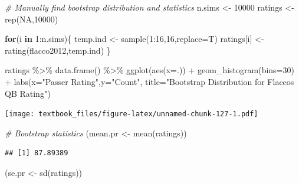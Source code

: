 \documentclass[
  11pt,
]{book}
\newenvironment{Shaded}{\begin{snugshade}}{\end{snugshade}}
\newcommand{\AttributeTok}[1]{\textcolor[rgb]{0.77,0.63,0.00}{#1}}
\newcommand{\CommentTok}[1]{\textcolor[rgb]{0.56,0.35,0.01}{\textit{#1}}}
\newcommand{\ConstantTok}[1]{\textcolor[rgb]{0.00,0.00,0.00}{#1}}
\newcommand{\ControlFlowTok}[1]{\textcolor[rgb]{0.13,0.29,0.53}{\textbf{#1}}}
\newcommand{\DecValTok}[1]{\textcolor[rgb]{0.00,0.00,0.81}{#1}}
\newcommand{\FunctionTok}[1]{\textcolor[rgb]{0.00,0.00,0.00}{#1}}
\newcommand{\NormalTok}[1]{#1}
\newcommand{\OtherTok}[1]{\textcolor[rgb]{0.56,0.35,0.01}{#1}}
\newcommand{\SpecialCharTok}[1]{\textcolor[rgb]{0.00,0.00,0.00}{#1}}
\newcommand{\StringTok}[1]{\textcolor[rgb]{0.31,0.60,0.02}{#1}}
\theoremstyle{definition}
\theoremstyle{definition}
\theoremstyle{definition}
\theoremstyle{definition}
\theoremstyle{remark}
\begin{document}
\newpage

\begin{Shaded}
\begin{Highlighting}[]
\CommentTok{\# Manually find bootstrap distribution and statistics}
\NormalTok{n.sims }\OtherTok{\textless{}{-}} \DecValTok{10000}
\NormalTok{ratings }\OtherTok{\textless{}{-}} \FunctionTok{rep}\NormalTok{(}\ConstantTok{NA}\NormalTok{,}\DecValTok{10000}\NormalTok{)}

\ControlFlowTok{for}\NormalTok{(i }\ControlFlowTok{in} \DecValTok{1}\SpecialCharTok{:}\NormalTok{n.sims)\{}
\NormalTok{  temp.ind }\OtherTok{\textless{}{-}} \FunctionTok{sample}\NormalTok{(}\DecValTok{1}\SpecialCharTok{:}\DecValTok{16}\NormalTok{,}\DecValTok{16}\NormalTok{,}\AttributeTok{replace=}\NormalTok{T)}
\NormalTok{  ratings[i] }\OtherTok{\textless{}{-}} \FunctionTok{rating}\NormalTok{(flacco2012,temp.ind)}
\NormalTok{\}}

\NormalTok{ratings }\SpecialCharTok{\%\textgreater{}\%} \FunctionTok{data.frame}\NormalTok{() }\SpecialCharTok{\%\textgreater{}\%} 
  \FunctionTok{ggplot}\NormalTok{(}\FunctionTok{aes}\NormalTok{(}\AttributeTok{x=}\NormalTok{.)) }\SpecialCharTok{+} \FunctionTok{geom\_histogram}\NormalTok{(}\AttributeTok{bins=}\DecValTok{30}\NormalTok{) }\SpecialCharTok{+}
  \FunctionTok{labs}\NormalTok{(}\AttributeTok{x=}\StringTok{"Passer Rating"}\NormalTok{,}\AttributeTok{y=}\StringTok{"Count"}\NormalTok{,}
       \AttributeTok{title=}\StringTok{"Bootstrap Distribution for Flacco\textquotesingle{}s QB Rating"}\NormalTok{)}
\end{Highlighting}
\end{Shaded}

\texttt{[image: textbook\_files/figure-latex/unnamed-chunk-127-1.pdf]}

\newpage

\begin{Shaded}
\begin{Highlighting}[]
\CommentTok{\# Bootstrap statistics}
\NormalTok{(mean.pr }\OtherTok{\textless{}{-}} \FunctionTok{mean}\NormalTok{(ratings))}
\end{Highlighting}
\end{Shaded}

\begin{verbatim}
## [1] 87.89389
\end{verbatim}

\begin{Shaded}
\begin{Highlighting}[]
\NormalTok{(se.pr }\OtherTok{\textless{}{-}} \FunctionTok{sd}\NormalTok{(ratings))}
\end{Highlighting}
\end{Shaded}
\end{document}

